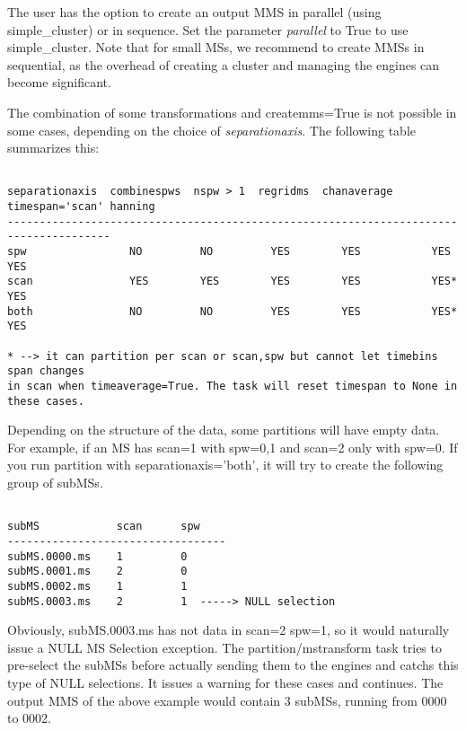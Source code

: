 The user has the option to create an output MMS in parallel (using simple_cluster) or
in sequence. Set the parameter {\it parallel} to True to use simple_cluster.
Note that for small MSs, we recommend to create MMSs in sequential, as the overhead of creating
a cluster and managing the engines can become significant.

The combination of some transformations and createmms=True is not possible in
some cases, depending on the choice of {\it separationaxis}. The following table summarizes this:

\begin{verbatim}

separationaxis  combinespws  nspw > 1  regridms  chanaverage  timespan='scan' hanning
--------------------------------------------------------------------------------------
spw                NO         NO         YES        YES           YES           YES
scan               YES        YES        YES        YES           YES*          YES
both               NO         NO         YES        YES           YES*          YES

* --> it can partition per scan or scan,spw but cannot let timebins span changes
in scan when timeaverage=True. The task will reset timespan to None in these cases.

\end{verbatim}

Depending on the structure of the data, some partitions will have empty data.
For example, if an MS has scan=1 with spw=0,1 and scan=2 only with spw=0. If
you run partition with separationaxis='both', it will try to create the
following group of subMSs.

\begin{verbatim}

subMS            scan      spw
----------------------------------
subMS.0000.ms    1         0
subMS.0001.ms    2         0
subMS.0002.ms    1         1
subMS.0003.ms    2         1  -----> NULL selection

\end{verbatim}

Obviously, subMS.0003.ms has not data in scan=2 spw=1, so it would naturally
issue a NULL MS Selection exception. The partition/mstransform task tries to
pre-select the subMSs before actually sending them to the engines and catchs 
this type of NULL selections. It issues a warning for these cases and continues.
The output MMS of the above example would contain 3 subMSs, running from 0000
to 0002.

